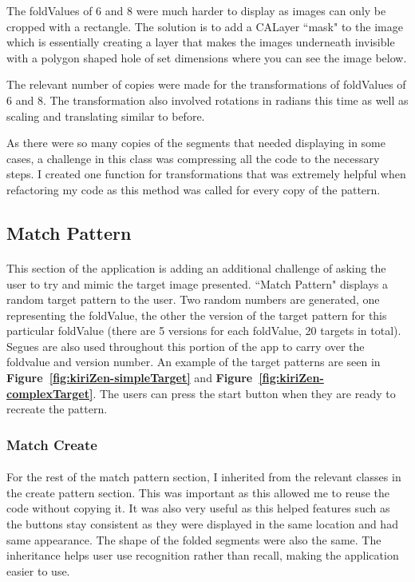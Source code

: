 \documentclass[11pt]{article}
\begin{document}
            The foldValues of 6 and 8 were much harder to display as images can only be cropped with a rectangle. The solution is to add a CALayer ``mask" to the image which is essentially creating a layer that makes the images underneath invisible with a polygon shaped hole of set dimensions where you can see the image below.
            
            The relevant number of copies were made for the transformations of foldValues of 6 and 8. The transformation also involved rotations in radians this time as well as scaling and translating similar to before.
                    
            As there were so many copies of the segments that needed displaying in some cases, a challenge in this class was compressing all the code to the necessary steps. I created one function for transformations that was extremely helpful when refactoring my code as this method was called for every copy of the pattern. 
            

    \subsection{Match Pattern}
            \paragraph{}
            This section of the application is adding an additional challenge of asking the user to try and mimic the target image presented. ``Match Pattern" displays a random target pattern to the user. Two random numbers are generated, one representing the foldValue, the other the version of the target pattern for this particular foldValue (there are 5 versions for each foldValue, 20 targets in total). Segues are also used throughout this portion of the app to carry over the foldvalue and version number. An example of the target patterns are seen in \textbf{Figure~\ref{fig:kiriZen-simpleTarget}} and \textbf{Figure~\ref{fig:kiriZen-complexTarget}}. The users can press the start button when they are ready to recreate the pattern.
                    
        \subsubsection{Match Create}
            \paragraph{}
            For the rest of the match pattern section, I inherited from the relevant classes in the create pattern section. This was important as this allowed me to reuse the code without copying it. It was also very useful as this helped features such as the buttons stay consistent as they were displayed in the same location and had same appearance. The shape of the folded segments were also the same. The inheritance helps user use recognition rather than recall, making the application easier to use. 
\end{document}
